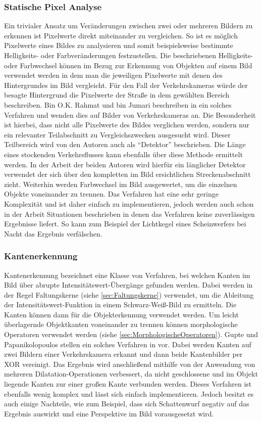 \subsubsection{Statische Pixel Analyse}
Ein trivialer Ansatz um Veränderungen zwischen zwei oder mehreren Bildern zu erkennen ist Pixelwerte direkt miteinander zu vergleichen.
So ist es möglich Pixelwerte eines Bildes zu analysieren und somit beispielsweise bestimmte Helligkeits- oder Farbveränderungen festzustellen.
Die beschriebenen Helligkeits- oder Farbwechsel können im Bezug zur Erkennung von Objekten auf einem Bild verwendet werden in dem man die jeweiligen Pixelwerte mit denen des Hintergrundes im Bild vergleicht.
Für den Fall der Verkehrskameras würde der besagte Hintergrund die Pixelwerte der Straße in dem gewählten Bereich beschreiben.
Bin O.K. Rahmat und bin Jumari beschreiben in \cite{bin2001vehicle} ein solches Verfahren und wenden dies auf Bilder von Verkehrskameras an. 
Die Besonderheit ist hierbei, dass nicht alle Pixelwerte des Bildes verglichen werden, sondern nur ein relevanter Teilabschnitt zu Vergleichszwecken ausgesucht wird. 
Dieser Teilbereich wird von den Autoren auch als "`Detektor"' beschrieben.
Die Länge eines stockenden Verkehrsflusses kann ebenfalls über diese Methode ermittelt werden. 
In der Arbeit der beiden Autoren wird hierfür ein länglicher Detektor verwendet der sich über den kompletten im Bild ersichtlichen Streckenabschnitt zieht.
Weiterhin werden Farbwechsel im Bild ausgewertet, um die einzelnen Objekte voneinander zu trennen.
Das Verfahren hat eine sehr geringe Komplexität und ist daher einfach zu implementieren, jedoch werden auch schon in der Arbeit Situationen beschrieben in denen das Verfahren keine zuverlässigen Ergebnisse liefert. 
So kann zum Beispiel der Lichtkegel eines Scheinwerfers bei Nacht das Ergebnis verfälschen.
\subsubsection{Kantenerkennung}
Kantenerkennung bezeichnet eine Klasse von Verfahren, bei welchen Kanten im Bild über abrupte Intensitätswert-Übergänge gefunden werden. 
Dabei werden in der Regel Faltungskerne (siehe \ref{sec:Faltungskerne}) verwendet, um die Ableitung der Intensitätswert-Funktion in einem Schwarz-Weiß-Bild zu ermitteln.
Die Kanten können dann für die Objekterkennung verwendet werden. Um leicht überlagernde Objektkanten voneinander zu trennen können morphologische Operatoren verwendet werden (siehe \ref{sec:MorphologischeOperatoren}).
Gupte und Papanikolopoulos stellen ein solches Verfahren in \cite{gupte2000algorithms} vor. Dabei werden Kanten auf zwei Bildern einer Verkehrskamera erkannt und dann beide Kantenbilder per XOR vereinigt. Das Ergebnis wird anschließend mithilfe von der Anwendung von mehreren Dilatation-Operationen verbessert, da nicht geschlossene und im Objekt liegende Kanten zur einer großen Kante verbunden werden.
Dieses Verfahren ist ebenfalls wenig komplex und lässt sich einfach implementieren. 
Jedoch besitzt es auch einige Nachteile, wie zum Beispiel, dass sich Schattenwurf negativ auf das Ergebnis auswirkt und eine Perspektive im Bild vorausgesetzt wird.
